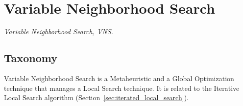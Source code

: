

\section{Variable Neighborhood Search} 
\label{sec:variable_neighborhood_search}

\emph{Variable Neighborhood Search, VNS.}

\subsection{Taxonomy}
Variable Neighborhood Search is a Metaheuristic and a Global Optimization technique that manages a Local Search technique.
It is related to the Iterative Local Search algorithm (Section~\ref{sec:iterated_local_search}).

